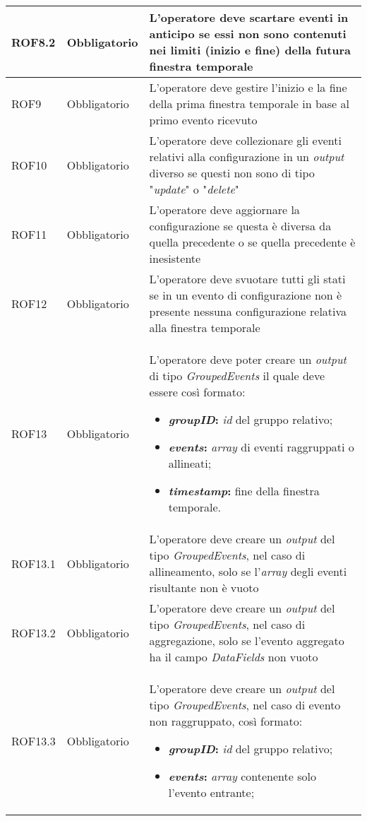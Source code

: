 {\begin{longtable}{L{3cm} L{3cm} L{7.5cm}}
\hline
ROF8.2 & Obbligatorio & L'operatore deve scartare eventi in anticipo se essi non sono contenuti nei limiti (inizio e fine) della futura finestra temporale\\
\hline
ROF9 & Obbligatorio & L'operatore deve gestire l'inizio e la fine della prima finestra temporale in base al primo evento ricevuto\\
\hline
ROF10 & Obbligatorio & L'operatore deve collezionare gli eventi relativi alla configurazione in un \textit{output} diverso se questi non sono di tipo "\textit{update}" o "\textit{delete}"\\
\hline
ROF11 & Obbligatorio & L'operatore deve aggiornare la configurazione se questa è diversa da quella precedente o se quella precedente è inesistente\\
\hline
ROF12 & Obbligatorio & L'operatore deve svuotare tutti gli stati se in un evento di configurazione non è presente nessuna configurazione relativa alla finestra temporale\\
\hline
ROF13 & Obbligatorio & L'operatore deve poter creare un \textit{output} di tipo \textit{GroupedEvents} il quale deve essere così formato:
\begin{itemize}
	\item{\textbf{\textit{groupID}:} \textit{id} del gruppo relativo;}
	\item{\textbf{\textit{events}:} \textit{array} di eventi raggruppati o allineati;}
	\item{\textbf{\textit{\textit{\gls{timestamp}}}:} fine della finestra temporale.}
\end{itemize}\\
\hline
ROF13.1 & Obbligatorio & L'operatore deve creare un \textit{output} del tipo \textit{GroupedEvents}, nel caso di allineamento, solo se l'\textit{array} degli eventi risultante non è vuoto\\
\hline
ROF13.2 & Obbligatorio & L'operatore deve creare un \textit{output} del tipo \textit{GroupedEvents}, nel caso di aggregazione, solo se l'evento aggregato ha il campo \textit{DataFields} non vuoto\\
\hline
ROF13.3 & Obbligatorio & L'operatore deve creare un \textit{output} del tipo \textit{GroupedEvents}, nel caso di evento non raggruppato, così formato:
\begin{itemize}
	\item{\textbf{\textit{groupID}:} \textit{id} del gruppo relativo;}
	\item{\textbf{\textit{events}:} \textit{array} contenente solo l'evento entrante;}

\end{itemize}
\end{longtable}}
